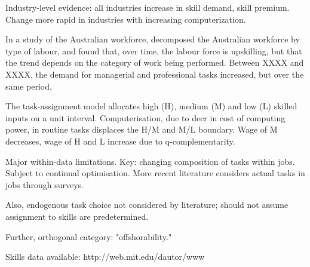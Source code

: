 Industry-level evidence: all industries increase in skill demand, skill premium. Change more rapid in industries with increasing computerization.

In a study of the Australian workforce, \citet{Esposto2012} decomposed the Australian workforce by type of labour, and found that, over time, the labour force is upskilling, but that the trend depends on the category of work being performed. Between XXXX and XXXX, the demand for managerial and professional tasks increased, but over the same period, 

The task-assignment model allocates high (H), medium (M) and low (L) skilled inputs on a unit interval. Computerisation, due to decr in cost of computing power, in routine tasks displaces the H/M and M/L boundary. Wage of M decreases, wage of H and L increase due to q-complementarity.

Major within-data limitations. Key: changing composition of tasks within jobs. Subject to continual optimisation. More recent literature considers actual tasks in jobs through surveys.
        
Also, endogenous task choice not considered by literature; should not assume assignment to skills are predetermined.
        
Further, orthogonal category: "offshorability."

Skills data available: http://web.mit.edu/dautor/www


